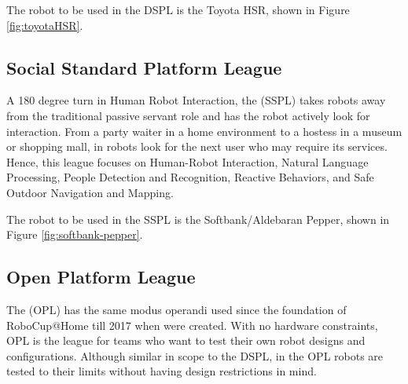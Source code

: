 The robot to be used in the DSPL is the Toyota HSR, shown in Figure \ref{fig:toyotaHSR}.

\subsection{Social Standard Platform League}
A 180 degree turn in Human Robot Interaction, the (SSPL) takes robots away from the traditional passive servant role and has the robot actively look for interaction. From a party waiter in a home environment to a hostess in a museum or shopping mall, in  robots look for the next user who may require its services. Hence, this league focuses on Human-Robot Interaction, Natural Language Processing, People Detection and Recognition, Reactive Behaviors, and Safe Outdoor Navigation and Mapping.

The robot to be used in the SSPL is the Softbank/Aldebaran Pepper, shown in Figure \ref{fig:softbank-pepper}.

\subsection{Open Platform League}
The (OPL) has the same modus operandi used since the foundation of RoboCup@Home till 2017 when  were created. With no hardware constraints, OPL is the league for teams who want to test their own robot designs and configurations. Although similar in scope to the DSPL, in the OPL robots are tested to their limits without having design restrictions in mind. 
